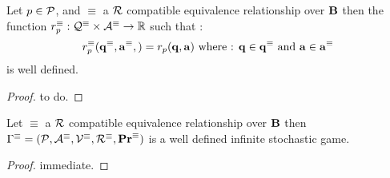 \begin{myprop}
	Let $p \in \mathcal{P}$, and $\equiv$ a $\mathcal{R}$ compatible equivalence relationship over $\text{\bf B}$ then the function $r_p^\equiv : \mathcal{Q}^\equiv \times \mathcal{A}^\equiv \rightarrow \mathbb{R}$ such that :
	$$r_p^\equiv(\mathbf{q}^\equiv,\mathbf{a}^\equiv,) = r_p(\mathbf{q},\mathbf{a}) \mbox{ where : } \mathbf{q}\in \mathbf{q}^\equiv \mbox{ and } \mathbf{a} \in \mathbf{a}^\equiv $$
	is well defined.
\end{myprop}
\begin{proof}
	to do.
\end{proof}

\begin{myprop}
	Let $\equiv$ a $\mathcal{R}$ compatible equivalence relationship over $\text{\bf B}$ then $\Gamma^\equiv = (\mathcal{P},\mathcal{A}^\equiv,\mathcal{V}^\equiv,\mathcal{R}^\equiv,\mathbf{Pr}^\equiv)$ is a well defined infinite stochastic game.
\end{myprop}

\begin{proof}
	immediate.
\end{proof}

